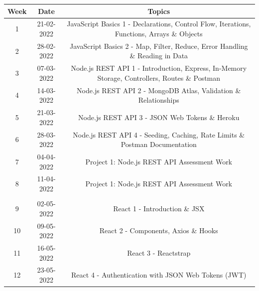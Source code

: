\documentclass{article}
\begin{document}
\renewcommand{\arraystretch}{1.5}
\begin{tabular}{|c|c|c|c|}
	\hline
	\textbf{Week} & \textbf{Date}     & \multicolumn{2}{c|}{\textbf{Topics}}        \\ \hline
	\footnotesize 1      & \footnotesize 21-02-2022 & \multicolumn{2}{c|}{\footnotesize JavaScript Basics 1 - Declarations, Control Flow, Iterations, Functions, Arrays \& Objects} \\ \hline
	\footnotesize 2      & \footnotesize 28-02-2022 & \multicolumn{2}{c|}{\footnotesize JavaScript Basics 2 - Map, Filter, Reduce, Error Handling \& Reading in Data} \\ \hline
	\footnotesize 3      & \footnotesize 07-03-2022 & \multicolumn{2}{c|}{\footnotesize Node.js REST API 1 - Introduction, Express, In-Memory Storage, Controllers, Routes \& Postman} \\ \hline
	\footnotesize 4      & \footnotesize 14-03-2022 & \multicolumn{2}{c|}{\footnotesize Node.js REST API 2 - MongoDB Atlas, Validation \& Relationships} \\ \hline
	\footnotesize 5      & \footnotesize 21-03-2022 & \multicolumn{2}{c|}{\footnotesize Node.js REST API 3 - JSON Web Tokens \& Heroku } \\ \hline
	\footnotesize 6      & \footnotesize 28-03-2022 & \multicolumn{2}{c|}{\footnotesize Node.js REST API 4 -  Seeding, Caching, Rate Limits \& Postman Documentation} \\ \hline
	\footnotesize 7      & \footnotesize 04-04-2022 & \multicolumn{2}{c|}{\footnotesize Project 1: Node.js REST API Assessment Work} \\ \hline
	\footnotesize 8      & \footnotesize 11-04-2022 & \multicolumn{2}{c|}{\footnotesize Project 1: Node.js REST API Assessment Work} \\ \hline
	\rowcolor{yellow} \multicolumn{4}{|c|}{\footnotesize Mid Term Break}                    \\ \hline
	\footnotesize 9      & \footnotesize 02-05-2022 & \multicolumn{2}{c|}{\footnotesize React 1 - Introduction \& JSX} \\ \hline
	\footnotesize 10     & \footnotesize 09-05-2022 & \multicolumn{2}{c|}{\footnotesize React 2 - Components, Axios \& Hooks} \\ \hline
	\footnotesize 11     & \footnotesize 16-05-2022 & \multicolumn{2}{c|}{\footnotesize React 3 - Reactstrap}     \\ \hline
	\footnotesize 12     & \footnotesize 23-05-2022 & \multicolumn{2}{c|}{\footnotesize React 4 - Authentication with JSON Web Tokens (JWT)}    \\ \hline

\end{tabular}
\end{document}
